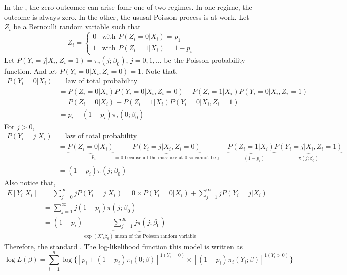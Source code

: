 In the , the zero outcomec can arise fomr one of two regimes. 
In one regime, the outcome is always zero. In the other, the ususal Poisson process is at work.
Let $Z_i$ be a Bernoulli random variable such that 
\begin{equation*}
    Z_i = \begin{cases}
        0 & \text{with }P(Z_i=0|X_i) = p_1\\
        1 & \text{with }P(Z_i=1|X_i) = 1-p_i
    \end{cases}
\end{equation*}
Let $P(Y_i=j|X_i,Z_i=1) = \pi_i(j;\beta_0),\, j=0,1,\ldots$ be the Poisson probability function. And let $P(Y_i=0|X_i,Z_i=0) = 1$.
Note that,
\begin{align*}
    P(Y_i=0|X_i) & \quad \text{law of total probability}\\
    & = P(Z_i=0|X_i)P(Y_i=0|X_i,Z_i=0) + P(Z_i=1|X_i)P(Y_i=0|X_i,Z_i=1)\\
    & = P(Z_i=0|X_i) + P(Z_i=1|X_i)P(Y_i=0|X_i,Z_i=1)\\
    & = p_i + (1-p_i)\pi_i(0;\beta_0)
\end{align*}
For $j>0$,
\begin{align*}
    P(Y_i=j|X_i) & \quad \text{law of total probability}\\
    & = \underbrace{P(Z_i=0|X_i)}_{=p_i}\underbrace{P(Y_i = j|X_i,Z_i = 0)}_{=0 \text{ because all the mass are at 0 so cannot be j}}
    + \underbrace{P(Z_i=1|X_i)}_{=(1-p_i)}\underbrace{P(Y_i=j|X_i,Z_i=1)}_{\pi(j;\beta_0)}\\
    & = (1-p_i)\pi(j;\beta_0)
\end{align*}
Also notice that,
\begin{align*}
    E[Y_i|X_i] & = \sum_{j=0}^{\infty}jP(Y_i=j|X_i) = 0\times P(Y_i=0|X_i) + \sum_{j=1}^{\infty}jP(Y_i=j|X_i)\\
    & = \sum_{j=1}^{\infty}j(1-p_i)\pi(j;\beta_0)\\
    & = (1-p_i)\underbrace{\sum_{j=1}^{\infty}j\pi(j;\beta_0)}_{\exp(X'_i\beta_0)\text{ mean of the Poisson random variable}}
\end{align*}
Therefore, the standard .
The log-likelihood function this model is written as 
\begin{equation}
    \log L(\beta) = \sum_{i=1}^{n}\log\{[p_i+(1-p_i)\pi_i(0;\beta)]^{1(Y_i=0)}\times[(1-p_i)\pi_i(Y_i;\beta)]^{1(Y_i>0)}\}
\end{equation}

